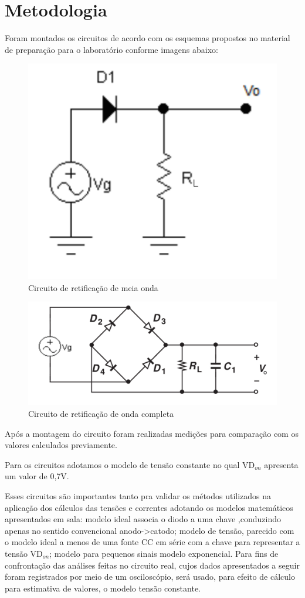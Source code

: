 \newpage
\section{Metodologia}

Foram montados os circuitos de acordo com os esquemas propostos no material de preparação para o laboratório
conforme imagens abaixo:

\begin{figure}[!ht]
\label{meia}
\includegraphics[width=0.5\linewidth]{meia.png}
\caption{Circuito de retificação de meia onda}

\end{figure}

\begin{figure}[!ht]
\label{completa}
\includegraphics[width=0.5\linewidth]{completa.png}
\caption{Circuito de retificação de onda completa}

\end{figure}

Após a montagem do circuito foram realizadas medições para comparação com os valores calculados previamente.

Para os circuitos adotamos o modelo de tensão constante no qual VD$_{on}$ apresenta um valor de 0,7V. 

Esses circuitos são importantes tanto pra validar os métodos utilizados na aplicação dos cálculos das tensões e correntes adotando os modelos matemáticos apresentados em sala: modelo ideal associa o diodo a uma chave ,conduzindo apenas no sentido convencional anodo->catodo; modelo de tensão, parecido com o modelo ideal a menos de uma fonte CC em série com a chave para representar a tensão VD$_{on}$; modelo para pequenos sinais modelo exponencial.
Para fins de confrontação das análises feitas no circuito real, cujos dados apresentados a seguir foram registrados por meio de um osciloscópio, será usado, para efeito de cálculo para estimativa de valores, o modelo tensão constante.


